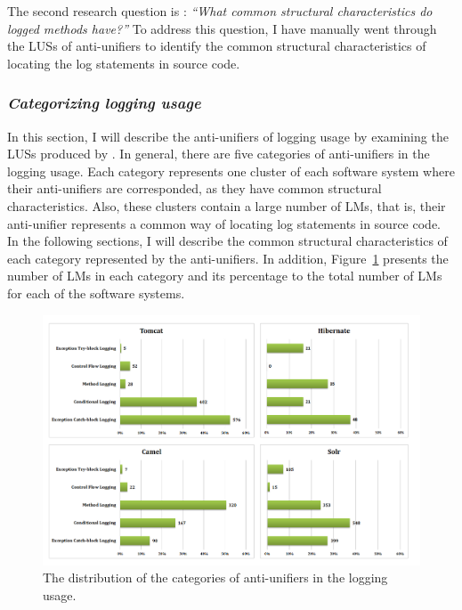 The second research question is : \emph{``What common structural characteristics do logged methods have?''}
To address this question, I have manually went through the LUSs of anti-unifiers to identify the common structural characteristics of locating the log statements in source code.


\subsubsection{\emph{Categorizing logging usage}} \label{categories}
In this section, I will describe the anti-unifiers of logging usage by examining the LUSs produced by . In general, there are five categories of anti-unifiers in the logging usage. Each category represents one cluster of each software system where their anti-unifiers are corresponded, as they have common structural characteristics. Also, these clusters contain a large number of LMs, that is, their anti-unifier represents a common way of locating log statements in source code. In the following sections, I will describe the common structural characteristics of each category represented by the anti-unifiers. In addition, Figure~\ref{fig:categories} presents the number of LMs in each category and its percentage to the total number of LMs for each of the software systems.

\begin{figure} [p]
   \centering\includegraphics [width = 1\textwidth, height = 0.7\textheight]{Charts/Categories.png}
  \caption{The distribution of the categories of anti-unifiers in the logging usage.}
  \label{fig:categories}
\end{figure}


